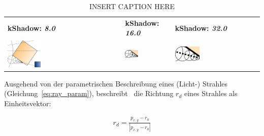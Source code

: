 \begin{table}[H]
    \centering
    \caption{INSERT CAPTION HERE\protect\footnotemark}\label{table:sphere_tracing_3}
    \begin{tabular}{p{}p{}p{}}
        \toprule
            \textbf{kShadow: \textit{8.0}} &
            \textbf{kShadow: \textit{16.0}}   &
            \textbf{kShadow: \textit{32.0}}   \\
        \cmidrule(r){1-1}\cmidrule(lr){2-2}\cmidrule(l){3-3}
            \includegraphics[width=0.3\textwidth]{img/sphere_tracing_principle_3_0.png} \newline &
            \includegraphics[width=0.3\textwidth]{img/sphere_tracing_principle_3_1.png} \newline &
            \includegraphics[width=0.3\textwidth]{img/sphere_tracing_principle_3_2.png} \newline \\
        \bottomrule
    \end{tabular}
\end{table}

Ausgehend von der parametrischen Beschreibung eines (Licht-) Strahles
(Gleichung~\ref{eq:ray_param}), beschreibt~\cite{hart_sphere_1994} die Richtung
$r_{d}$ eines Strahles als Einheitsvektor:

\begin{gather}
    r_{d} = \frac{p_{x, y} - r_{0}}{|p_{x, y} - r_{0}|}
\end{gather}

